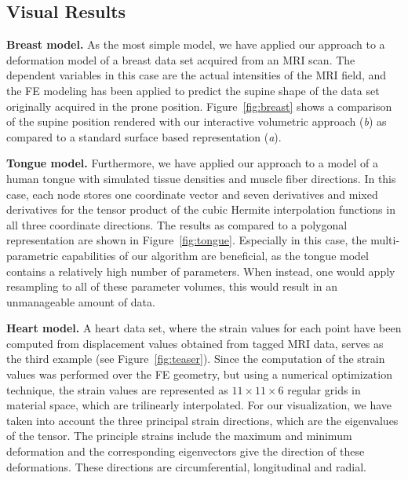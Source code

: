 \documentclass[review,journal]{vgtc}         %
\begin{document}
\subsection{Visual Results}

\noindent \textbf{Breast model.} As the most simple model, we have applied our approach to a deformation model of a breast data set acquired from an MRI scan. The dependent variables in this case are the actual intensities of the MRI field, and the FE modeling has been applied to predict the supine shape of the data set originally acquired in the prone position. Figure~\ref{fig:breast} shows a comparison of the supine position rendered with our interactive volumetric approach ({\it b}) as compared to a standard surface based representation ({\it a}).

\noindent \textbf{Tongue model.} Furthermore, we have applied our approach to a model of a human tongue with simulated tissue densities and muscle fiber directions. In this case, each node stores one coordinate vector and seven derivatives and mixed derivatives for the tensor product of the cubic Hermite interpolation functions in all three coordinate directions. The results as compared to a polygonal representation are shown in Figure~\ref{fig:tongue}. Especially in this case, the multi-parametric capabilities of our algorithm are beneficial, as the tongue model contains a relatively high number of parameters. When instead, one would apply resampling to all of these parameter volumes, this would result in an unmanageable amount of data.

\noindent \textbf{Heart model.} A heart data set, where the strain values for each point have been computed from displacement values obtained from tagged MRI data, serves as the third example (see Figure~\ref{fig:teaser}). Since the computation of the strain values was performed over the FE geometry, but using a numerical optimization technique, the strain values are represented as $11 \times 11 \times 6$ regular grids in material space, which are trilinearly interpolated. For our visualization, we have taken into account the three principal strain directions, which are the eigenvalues of the tensor. The principle strains include the maximum and minimum deformation and the corresponding eigenvectors give the direction of these deformations. These directions are circumferential, longitudinal and radial.
\end{document}
